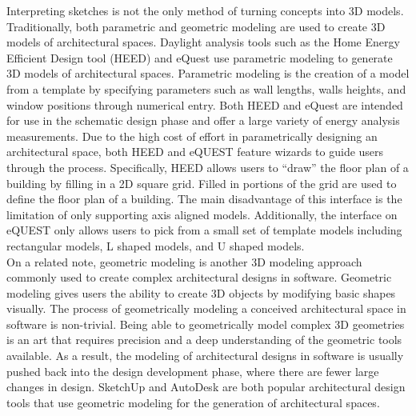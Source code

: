 	Interpreting sketches is not the only method of turning concepts into 3D models.
	Traditionally, both parametric and geometric modeling are used to create 3D models of architectural spaces.
	Daylight analysis tools such as the Home Energy Efficient Design tool (HEED) and eQuest use parametric modeling to generate 3D models of architectural spaces\cite{hirsch2010equest,milne2001drag}.
	Parametric modeling is the creation of a model from a template by specifying parameters such as wall lengths, walls heights, and window positions through numerical entry.
	Both HEED and eQuest are intended for use in the schematic design phase and offer a large variety of energy analysis measurements.
	Due to the high cost of effort in parametrically designing an architectural space, both HEED and eQUEST feature wizards to guide users through the process. 
	Specifically, HEED allows users to ``draw'' the floor plan of a building by filling in a 2D square grid. Filled in portions of the grid are used to define the floor plan of a building. The main disadvantage of this interface is the limitation of only supporting axis aligned models. 
	Additionally, the interface on eQUEST only allows users to pick from a small set of template models including rectangular models, L shaped models, and U shaped models.\\

	On a related note, geometric modeling is another 3D modeling approach commonly used to create complex architectural designs in software.
	Geometric modeling gives users the ability to create 3D objects by modifying basic shapes visually.
	The process of geometrically modeling a conceived architectural space in software is non-trivial.
	Being able to geometrically model complex 3D geometries is an art that requires precision and a deep understanding of the geometric tools available.
	As a result, the modeling of architectural designs in software is usually pushed back into the design development phase, where there are fewer large changes in design\cite{Galasiu}.
	SketchUp and AutoDesk are both popular architectural design tools that use geometric modeling for the generation of architectural spaces\cite{sketchup,autodesk}. \\

